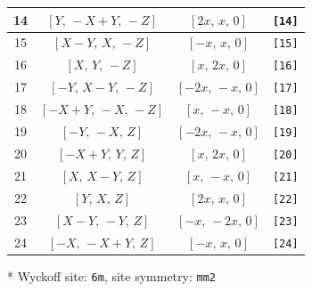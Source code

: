 \documentclass[fleqn,8pt]{jsarticle}
\begin{document}
\begin{longtable}{cccc}
14 & $\left[ Y,\, - X + Y,\, - Z \right]$ & $\left[ 2 x,\, x,\, 0 \right]$ & {\tt [14]} \\ \hline
15 & $\left[ X - Y,\, X,\, - Z \right]$ & $\left[ - x,\, x,\, 0 \right]$ & {\tt [15]} \\ \hline
16 & $\left[ X,\, Y,\, - Z \right]$ & $\left[ x,\, 2 x,\, 0 \right]$ & {\tt [16]} \\ \hline
17 & $\left[ - Y,\, X - Y,\, - Z \right]$ & $\left[ - 2 x,\, - x,\, 0 \right]$ & {\tt [17]} \\ \hline
18 & $\left[ - X + Y,\, - X,\, - Z \right]$ & $\left[ x,\, - x,\, 0 \right]$ & {\tt [18]} \\ \hline
19 & $\left[ - Y,\, - X,\, Z \right]$ & $\left[ - 2 x,\, - x,\, 0 \right]$ & {\tt [19]} \\ \hline
20 & $\left[ - X + Y,\, Y,\, Z \right]$ & $\left[ x,\, 2 x,\, 0 \right]$ & {\tt [20]} \\ \hline
21 & $\left[ X,\, X - Y,\, Z \right]$ & $\left[ x,\, - x,\, 0 \right]$ & {\tt [21]} \\ \hline
22 & $\left[ Y,\, X,\, Z \right]$ & $\left[ 2 x,\, x,\, 0 \right]$ & {\tt [22]} \\ \hline
23 & $\left[ X - Y,\, - Y,\, Z \right]$ & $\left[ - x,\, - 2 x,\, 0 \right]$ & {\tt [23]} \\ \hline
24 & $\left[ - X,\, - X + Y,\, Z \right]$ & $\left[ - x,\, x,\, 0 \right]$ & {\tt [24]} \\
\end{longtable}
* Wyckoff site: {\tt 6m}, site symmetry: {\tt mm2}
\renewcommand{\arraystretch}{1.2}
\end{document}
